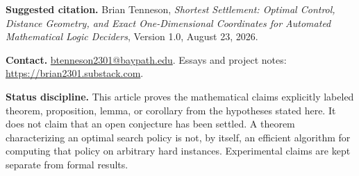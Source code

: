 \documentclass[11pt,letterpaper]{article}
\theoremstyle{remark}
\begin{document}
\vspace{0.35in}
\noindent\textbf{Suggested citation.} Brian Tenneson, \emph{Shortest Settlement: Optimal Control, Distance Geometry, and Exact One-Dimensional Coordinates for Automated Mathematical Logic Deciders}, Version 1.0, August 23, 2026.

\vspace{0.35in}
\noindent\textbf{Contact.} \href{mailto:btenneson2301@baypath.edu}{btenneson2301@baypath.edu}. Essays and project notes: \url{https://brian2301.substack.com}.

\vfill
\begin{statusbox}
\small
\textbf{Status discipline.} This article proves the mathematical claims explicitly labeled theorem, proposition, lemma, or corollary from the hypotheses stated here. It does not claim that an open conjecture has been settled. A theorem characterizing an optimal search policy is not, by itself, an efficient algorithm for computing that policy on arbitrary hard instances. Experimental claims are kept separate from formal results.
\end{statusbox}
\clearpage
\end{document}
